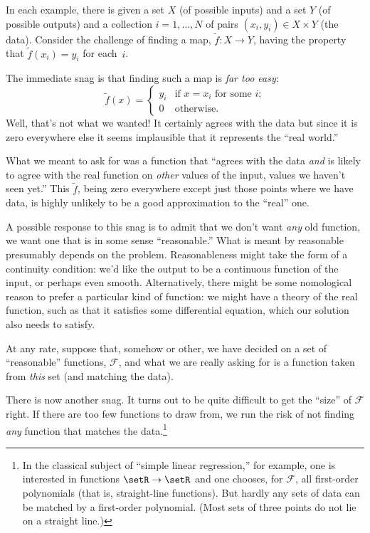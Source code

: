 \documentclass[11pt, a4paper]{article}
\begin{document}
In each example, there is given a set $X$ (of possible inputs) and a
set $Y$ (of possible outputs) and a collection $i=1,\dots,N$ of pairs
$(x_i, y_i)\in X\times Y$ (the data). Consider the challenge of finding a
map, $\tilde{f}\colon X\to Y$, having the property that $\tilde{f}(x_i)=
y_i$ for each~$i$.

The immediate snag is that finding such a map is \emph{far too easy}:
\begin{equation*}
  \tilde{f}(x) =
  \begin{cases}
    y_i & \text{if $x = x_i$ for some $i$;} \\
      0 & \text{otherwise}.
  \end{cases}
\end{equation*}
Well, that's not what we wanted! It certainly agrees with the data but
since it is zero everywhere else it seems implausible that it
represents the “real world.”

What we meant to ask for was a function that “agrees with the data
\emph{and} is likely to agree with the real function on \emph{other}
values of the input, values we haven't seen yet.” This $\tilde{f}$,
being zero everywhere except just those points where we have data, is
highly unlikely to be a good approximation to the “real” one.

A possible response to this snag is to admit that we don't want
\emph{any} old function, we want one that is in some sense
“reasonable.” What is meant by reasonable presumably depends on the
problem. Reasonableness might take the form of a continuity condition:
we'd like the output to be a continuous function of the input, or
perhaps even smooth. Alternatively, there might be some nomological
reason to prefer a particular kind of function: we might have a theory
of the real function, such as that it satisfies some differential
equation, which our solution also needs to satisfy.

At any rate, suppose that, somehow or other, we have decided on a set
of “reasonable” functions, $\mathcal{F}$, and what we are really asking for is a
function taken from \emph{this} set (and matching the data).

There is now another snag. It turns out to be quite difficult to get
the “size” of $\mathcal{F}$ right. If there are too few functions to draw from,
we run the risk of not finding \emph{any} function that matches the
data.\footnote{In the classical subject of “simple linear regression,”
for example, one is interested in functions $\setR \to \setR$ and one
chooses, for $\mathcal{F}$, all first-order polynomials (that is, straight-line
functions). But hardly any sets of data can be matched by a
first-order polynomial. (Most sets of three points do not lie on a
straight line.)}
\end{document}
